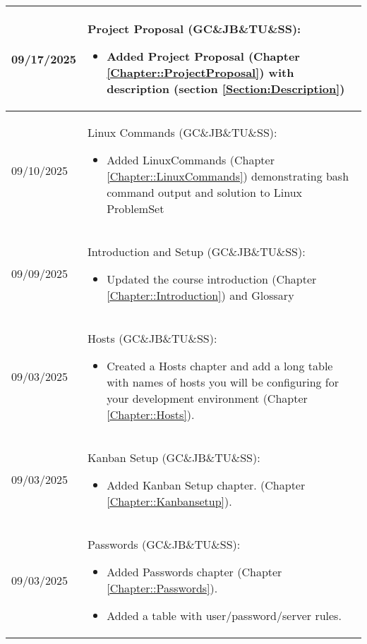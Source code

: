 \begin{longtable}{|l||p{13.5cm}|}
09/17/2025 & Project Proposal (GC\&JB\&TU\&SS):
\begin{itemize}[topsep=0pt,itemsep=0pt,parsep=0pt,partopsep=0pt,leftmargin=12pt]
\item Added Project Proposal (Chapter \ref{Chapter::ProjectProposal}) with description (section \ref{Section:Description})
\end{itemize} 
\\ \hline

09/10/2025 & Linux Commands (GC\&JB\&TU\&SS):
\begin{itemize}[topsep=0pt,itemsep=0pt,parsep=0pt,partopsep=0pt,leftmargin=12pt]
\item Added LinuxCommands (Chapter \ref{Chapter::LinuxCommands}) demonstrating bash command output and solution to Linux ProblemSet
\end{itemize} 
\\ \hline

09/09/2025 & Introduction and Setup (GC\&JB\&TU\&SS):
\begin{itemize}[topsep=0pt,itemsep=0pt,parsep=0pt,partopsep=0pt,leftmargin=12pt]
\item Updated the course introduction (Chapter \ref{Chapter::Introduction}) and Glossary
\end{itemize} 
\\ \hline

09/03/2025 & Hosts (GC\&JB\&TU\&SS):
\begin{itemize}[topsep=0pt,itemsep=0pt,parsep=0pt,partopsep=0pt,leftmargin=12pt]
\item Created a Hosts chapter and add a long table with names of hosts you will be configuring for your development environment (Chapter \ref{Chapter::Hosts}).
\end{itemize} 
\\ \hline

09/03/2025 & Kanban Setup (GC\&JB\&TU\&SS):
\begin{itemize}[topsep=0pt,itemsep=0pt,parsep=0pt,partopsep=0pt,leftmargin=12pt]
\item Added Kanban Setup chapter.
(Chapter \ref{Chapter::Kanbansetup}).
\end{itemize} 
\\ \hline

09/03/2025 & Passwords (GC\&JB\&TU\&SS):
\begin{itemize}[topsep=0pt,itemsep=0pt,parsep=0pt,partopsep=0pt,leftmargin=12pt]
\item Added Passwords chapter
(Chapter \ref{Chapter::Passwords}).
\item Added a table with user/password/server rules. 
\end{itemize} 
\\ \hline

\end{longtable}
